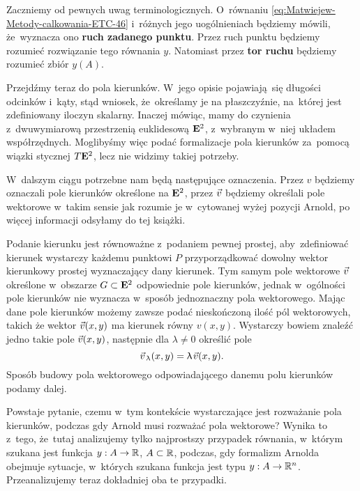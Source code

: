 \documentclass[a4paper,11pt]{article}
\numberwithin{equation}{section}
\begin{document}
Zaczniemy od pewnych uwag terminologicznych. O~równaniu
\eqref{eq:Matwiejew-Metody-calkowania-ETC-46} i~różnych jego
uogólnieniach będziemy mówili, że~wyznacza ono
\textbf{ruch zadanego punktu}. Przez ruch punktu będziemy rozumieć
rozwiązanie tego równania $y$. Natomiast przez \textbf{tor ruchu} będziemy
rozumieć zbiór $y( A )$.

Przejdźmy teraz do pola kierunków. W~jego opisie pojawiają~się długości
odcinków i~kąty, stąd wniosek, że~określamy je na płaszczyźnie, na~której
jest zdefiniowany iloczyn skalarny. Inaczej mówiąc, mamy do czynienia
z~dwuwymiarową
przestrzenią euklidesową $\mathbf{E}^{ 2 }$, z~wybranym w~niej układem
współrzędnych. Moglibyśmy więc podać formalizacje pola kierunków za~pomocą
wiązki stycznej $T \mathbf{E}^{ 2 }$, lecz nie widzimy takiej potrzeby.

W~dalszym ciągu potrzebne nam będą następujące oznaczenia. Przez $v$
będziemy oznaczali pole kierunków określone na $\mathbf{E}^{ 2 }$, przez
$\vec{v}$ będziemy określali pole wektorowe w~takim sensie jak rozumie je
w~cytowanej wyżej pozycji Arnold, po więcej informacji odsyłamy do tej
książki.

Podanie kierunku jest równoważne z~podaniem pewnej prostej, aby~zdefiniować
kierunek wystarczy każdemu punktowi $P$ przyporządkować dowolny wektor
kierunkowy prostej wyznaczający dany kierunek. Tym samym pole wektorowe
$\vec{v}$ określone w~obszarze $G \subset \mathbf{E}^{ 2 }$ odpowiednie pole kierunków,
jednak w~ogólności pole kierunków nie wyznacza w~sposób jednoznaczny pola
wektorowego. Mając dane pole kierunków możemy zawsze podać nieskończoną
ilość pól wektorowych, takich że wektor $\vec{v}( x, y )$ ma kierunek równy
$v( x, y )$. Wystarczy bowiem znaleźć jedno takie pole $\vec{v}( x, y )$,
następnie dla $\lambda \neq 0$ określić pole
\begin{equation}
  \label{eq:Matwiejew-Metody-calkowania-ETC-47}
  \vec{v}_{ \, \uplambda }( x, y ) = \uplambda \hspace{0.09em} \vec{v}( x, y ).
\end{equation}
Sposób budowy pola wektorowego odpowiadającego danemu polu kierunków podamy
dalej.

Powstaje pytanie, czemu w~tym kontekście wystarczające jest rozważanie pola
kierunków, podczas gdy Arnold musi rozważać pola wektorowe? Wynika to
z~tego, że~tutaj analizujemy tylko najprostszy przypadek równania, w~którym
szukana jest funkcja $y : A \to \mathbb{R}$, $A \subset \mathbb{R}$, podczas, gdy formalizm
Arnolda obejmuje sytuacje, w~których szukana funkcja jest typu
$y : A \to \mathbb{R}^{ n }$. Przeanalizujemy teraz dokładniej oba te przypadki.
\end{document}
